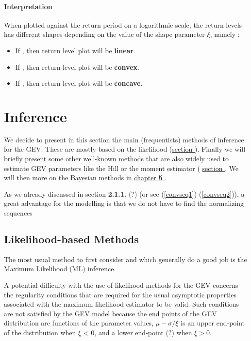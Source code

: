 \documentclass[11pt,a4paper,openany ]{book}
\begin{document}
\paragraph*{Interpretation}

When plotted against the return period on a logarithmic scale, the return levels has different shapes depending on the value of the shape parameter $\xi$, namely :

\begin{itemize}
	\item If , then return level plot will be \textbf{linear}.
     \item If , then return level plot will be \textbf{convex}.
     \item If , then return level plot will be \textbf{concave}.
\end{itemize}



\section{Inference}\label{sec::gevinfernce} 


We decide to present in this section the main (frequentists) methods of inference for the GEV. These are mostly based on the likelihood (\hyperref[likintro]{section }). Finally we will briefly present some other well-known methods that are also widely used to estimate GEV parameters like the Hill or the moment estimator ( \hyperref[gev:other]{section }. We will then more on the Bayesian methods in \hyperref[sec:bayesian]{chapter \textbf{5} }.
 
As we already discussed in section \textbf{2.1.1.} (?) (or see (\ref{convseq1})-(\ref{convseq2})), a great advantage for the modelling is that we do not have to find the normalizing sequences



\subsection{Likelihood-based Methods}\label{likintro}

The most usual method to first consider and which generally do a good job is the Maximum Likelihood (ML) inference.

A potential difficulty with the use of likelihood methods for the GEV concerns the regularity conditions that are required for the usual asymptotic properties associated with the
maximum likelihood estimator to be valid. Such conditions are not satisfied by the GEV
model because the end points of the GEV distribution are functions of the parameter values,
$\mu-\sigma/\xi$ is an upper end-point of the distribution when $\xi$ < 0, and a lower end-point (?) when
$\xi > 0$. \citet{saeb_general_2014}
\end{document}
